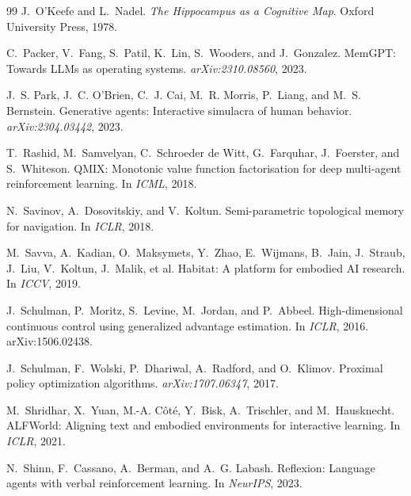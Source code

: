 \documentclass{article}
\begin{document}
\begin{thebibliography}{99}
J.~O'Keefe and L.~Nadel.
\newblock \emph{The Hippocampus as a Cognitive Map}.
\newblock Oxford University Press, 1978.

C.~Packer, V.~Fang, S.~Patil, K.~Lin, S.~Wooders, and J.~Gonzalez.
\newblock MemGPT: Towards LLMs as operating systems.
\newblock \emph{arXiv:2310.08560}, 2023.

J.~S. Park, J.~C. O'Brien, C.~J. Cai, M.~R. Morris, P.~Liang, and M.~S. Bernstein.
\newblock Generative agents: Interactive simulacra of human behavior.
\newblock \emph{arXiv:2304.03442}, 2023.

T.~Rashid, M.~Samvelyan, C.~Schroeder de Witt, G.~Farquhar, J.~Foerster, and S.~Whiteson.
\newblock QMIX: Monotonic value function factorisation for deep multi-agent reinforcement learning.
\newblock In \emph{ICML}, 2018.

N.~Savinov, A.~Dosovitskiy, and V.~Koltun.
\newblock Semi-parametric topological memory for navigation.
\newblock In \emph{ICLR}, 2018.

M.~Savva, A.~Kadian, O.~Maksymets, Y.~Zhao, E.~Wijmans, B.~Jain, J.~Straub, J.~Liu, V.~Koltun, J.~Malik, et al.
\newblock Habitat: A platform for embodied AI research.
\newblock In \emph{ICCV}, 2019.

J.~Schulman, P.~Moritz, S.~Levine, M.~Jordan, and P.~Abbeel.
\newblock High-dimensional continuous control using generalized advantage estimation.
\newblock In \emph{ICLR}, 2016.
\newblock arXiv:1506.02438.

J.~Schulman, F.~Wolski, P.~Dhariwal, A.~Radford, and O.~Klimov.
\newblock Proximal policy optimization algorithms.
\newblock \emph{arXiv:1707.06347}, 2017.

M.~Shridhar, X.~Yuan, M.-A. C\^ot\'e, Y.~Bisk, A.~Trischler, and M.~Hausknecht.
\newblock ALFWorld: Aligning text and embodied environments for interactive learning.
\newblock In \emph{ICLR}, 2021.

N.~Shinn, F.~Cassano, A.~Berman, and A.~G. Labash.
\newblock Reflexion: Language agents with verbal reinforcement learning.
\newblock In \emph{NeurIPS}, 2023.


\end{thebibliography}
\end{document}
